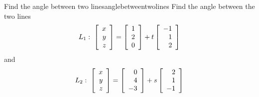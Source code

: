 \begin{example}{Find the angle between two lines}{anglebetweentwolines}
Find the angle between the two lines
\begin{equation*}
L_1:  \;
\left[
\begin{array}{r}
x \\
y \\
z 
\end{array}
\right]
 = 
\left[
\begin{array}{r}
1 \\
2 \\
0
\end{array}
\right] +t\left[
\begin{array}{r}
-1 \\
1 \\
2
\end{array}
\right] 
\end{equation*}
 and
\begin{equation*}
L_2: \;
\left[
\begin{array}{r}
x \\
y \\
z
\end{array}
\right]
 = 
\left[
\begin{array}{r}
0 \\
4 \\
-3
\end{array}
\right]
 +s\left[
\begin{array}{r}
2 \\
1 \\
-1
\end{array}
\right]
\end{equation*}
\end{example}

